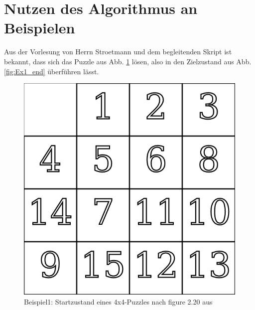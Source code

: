\section{Nutzen des Algorithmus an Beispielen} %
\label{sec:PermutationExamples}
Aus der Vorlesung von Herrn Stroetmann und dem begleitenden Skript \autocite{github-stroetmann:online} ist bekannt, dass sich das Puzzle aus Abb. \ref{fig:Ex1_start} lösen, also in den Zielzustand aus Abb. \ref{fig:Ex1_end} überführen lässt.\\
\begin{minipage}{\linewidth}
	\begin{minipage}[t]{0.45\linewidth}
		\begin{figure}[H]
			\centering
			\includegraphics[width=\linewidth,keepaspectratio]{img/Ex1_start.png}
			\captionsetup{format=plain, indention=0pt}
			\caption{Beispiel1: Startzustand eines 4x4-Puzzles nach figure 2.20 aus \autocite{github-stroetmann:online} \label{fig:Ex1_start}}
		\end{figure}
	\end{minipage}
	\hfill
	\begin{minipage}[t]{0.45\linewidth}
		\begin{figure}[H]
			\centering

\end{figure}
\end{minipage}
\end{minipage}
